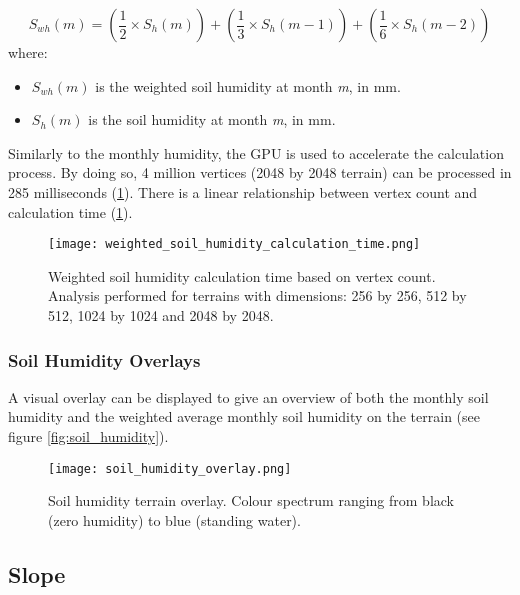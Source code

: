 \begin{equation} \label{eq:weighted_avg_monthly_humidity_calculation}
	S_{wh}(m) =  (\frac{1}{2} \times S_{h}(m)) + (\frac{1}{3} \times S_{h}(m-1)) + (\frac{1}{6} \times S_{h}(m-2))
\end{equation}
where:
\begin{itemize}
\item \textit{$S_{wh}(m)$} is the weighted soil humidity at month \textit{m}, in mm.\\
\item \textit{$S_{h}(m)$} is the soil humidity at month \textit{m}, in mm. \\
\end{itemize}

Similarly to the monthly humidity, the GPU is used to accelerate the calculation process. By doing so, 4 million vertices (2048 by 2048 terrain) can be processed in 285 milliseconds (\ref{fig:weighted_soil_humidity_calculation_time}). There is a linear relationship between vertex count and calculation time (\ref{fig:weighted_soil_humidity_calculation_time}).

\begin{figure}
\center
	\texttt{[image: weighted\_soil\_humidity\_calculation\_time.png]}
	\caption{ Weighted soil humidity calculation time based on vertex count. Analysis performed for terrains with dimensions: 256 by 256, 512 by 512, 1024 by 1024 and 2048 by 2048. }
	\label{fig:weighted_soil_humidity_calculation_time}
\end{figure}

\subsubsection{Soil Humidity Overlays}

A visual overlay can be displayed to give an overview of both the monthly soil humidity and the weighted average monthly soil humidity on the terrain (see figure \ref{fig:soil_humidity}).

\begin{figure}
\center
	\texttt{[image: soil\_humidity\_overlay.png]}
	\caption{ Soil humidity terrain overlay. Colour spectrum ranging from black (zero humidity) to blue (standing water). }
	\label{fig:soil_humidity overlay}
\end{figure}

\subsection{Slope}

